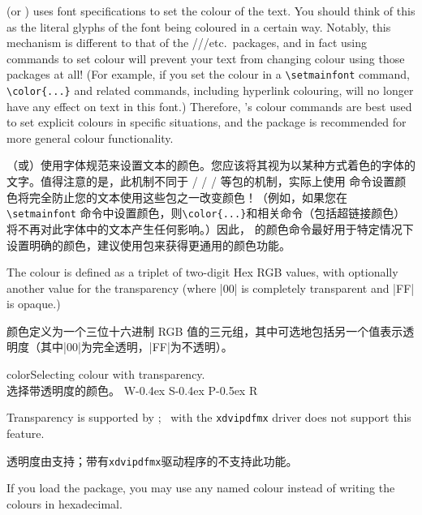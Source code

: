 \documentclass[a4paper]{l3doc}
\begin{document}
 (or ) uses font specifications to set the colour of
the text.
You should think of this as the literal glyphs of the font being coloured in a certain way.
Notably, this mechanism is different to that of the ///etc.\ packages, and in fact using  commands to set colour will prevent your text from changing colour using those packages at all!
(For example, if you set the colour in a \verb|\setmainfont| command, \verb|\color{...}| and related commands, including hyperlink colouring, will no longer have any effect on text in this font.)
Therefore, 's colour commands are best used to set explicit colours in specific situations, and the  package is recommended for more general colour functionality.

（或）使用字体规范来设置文本的颜色。您应该将其视为以某种方式着色的字体的文字。值得注意的是，此机制不同于 /  /  / 等包的机制，实际上使用 命令设置颜色将完全防止您的文本使用这些包之一改变颜色！（例如，如果您在\verb|\setmainfont| 命令中设置颜色，则\verb|\color{...}|和相关命令（包括超链接颜色）将不再对此字体中的文本产生任何影响。）因此， 的颜色命令最好用于特定情况下设置明确的颜色，建议使用包来获得更通用的颜色功能。

The colour is defined as a triplet of two-digit Hex RGB
values, with optionally another value for the transparency (where
|00| is completely transparent and |FF| is opaque.)

颜色定义为一个三位十六进制 RGB 值的三元组，其中可选地包括另一个值表示透明度（其中|00|为完全透明，|FF|为不透明）。

\begin{Lexample}{color}{Selecting colour with transparency.\\选择带透明度的颜色。}
  \fontsize{48}{48}
  {W}\kern-0.4ex
  {S}\kern-0.4ex
  {P}\kern-0.5ex
  {R}
\end{Lexample}
Transparency is supported by \LuaLaTeX; \XeLaTeX\ with the \texttt{xdvipdfmx} driver
does not support this feature.

透明度由\LuaLaTeX 支持；带有\texttt{xdvipdfmx}驱动程序的\XeLaTeX 不支持此功能。

If you load the  package, you may use any named colour instead
of writing the colours in hexadecimal.
\end{document}
